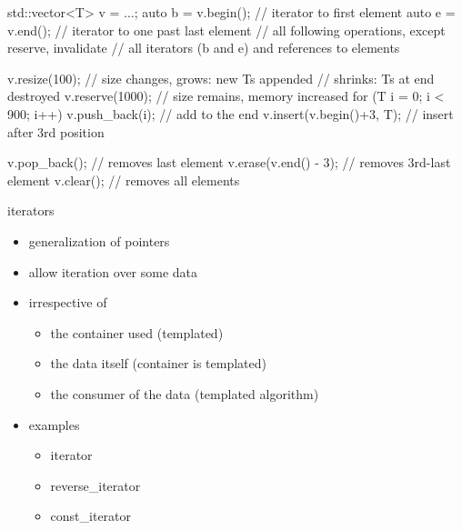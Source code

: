 \begin{frame}[fragile]
  \begin{cppcode*}{}
    std::vector<T> v = ...;
    auto b = v.begin(); // iterator to first element
    auto e = v.end();   // iterator to one past last element
    // all following operations, except reserve, invalidate
    // all iterators (b and e) and references to elements

    v.resize(100); // size changes, grows: new T{}s appended
                   //           shrinks: Ts at end destroyed
    v.reserve(1000); // size remains, memory increased
    for (T i = 0; i < 900; i++)
      v.push_back(i); // add to the end
    v.insert(v.begin()+3, T{}); // insert after 3rd position

    v.pop_back();         // removes last element
    v.erase(v.end() - 3); // removes 3rd-last element
    v.clear();            // removes all elements
  \end{cppcode*}
\end{frame}

\begin{frame}[fragile]
  \begin{block}{iterators}
    \begin{itemize}
    \item generalization of pointers
    \item allow iteration over some data
    \item irrespective of
      \begin{itemize}
      \item the container used (templated)
      \item the data itself (container is templated)
      \item the consumer of the data (templated algorithm)
      \end{itemize}
    \item examples
      \begin{itemize}
      \item iterator
      \item reverse\_iterator
      \item const\_iterator
      \end{itemize}
    \end{itemize}
  \end{block}
\end{frame}

